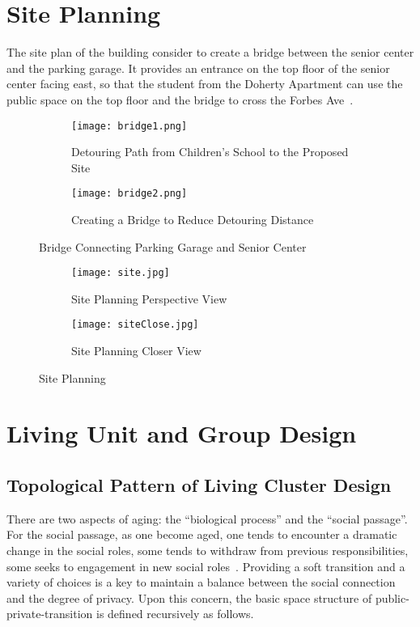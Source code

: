 \section{Site Planning}
The site plan of the building consider to create a bridge between the senior center and the parking garage. It provides an entrance on the top floor of the senior center facing east, so that the student from the Doherty Apartment can use the public space on the top floor and the bridge to cross the Forbes Ave~.
\begin{figure}
\centering
\begin{subfigure}{0.7\textwidth}
  \centering
  \texttt{[image: bridge1.png]}
  \caption{Detouring Path from Children's School to the Proposed Site}
  \label{fig:bridge1}
\end{subfigure}
\begin{subfigure}{0.7\textwidth}
  \centering
  \texttt{[image: bridge2.png]}
  \caption{Creating a Bridge to Reduce Detouring Distance}
  \label{fig:bridge2}
\end{subfigure}
\caption{Bridge Connecting Parking Garage and Senior Center}
\label{fig:bridge}
\end{figure}

\begin{figure}
\centering
\begin{subfigure}{\textwidth}
  \centering
  \texttt{[image: site.jpg]}
  \caption[Site Planning]{Site Planning Perspective View}
  \label{fig:site}
\end{subfigure}
\begin{subfigure}{\textwidth}
  \centering
  \texttt{[image: siteClose.jpg]}
  \caption[Site Planning Closer View]{Site Planning Closer View}
  \label{fig:siteClose}
\end{subfigure}
\caption{Site Planning}
\label{fig:siteAll}
\end{figure}
\section{Living Unit and Group Design}
\subsection{Topological Pattern of Living Cluster Design}
There are two aspects of aging: the ``biological process'' and the
``social passage''. For the social passage, as one become aged, one
tends to encounter a dramatic change in the social roles, some tends
to withdraw from previous responsibilities, some seeks to engagement
in new social roles~\cite{Perkins2004}. Providing a soft transition
and a variety of choices is a key to maintain a balance between the
social connection and the degree of privacy. Upon this concern, the
basic space structure of public-private-transition is defined
recursively as follows.

